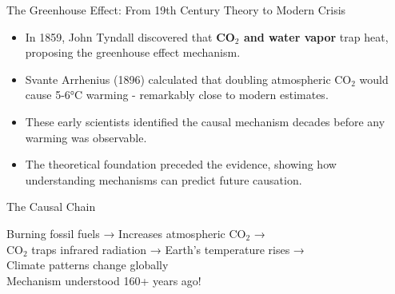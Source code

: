 \documentclass{beamer}
\begin{document}
	\begin{frame}{The Greenhouse Effect: From 19th Century Theory to Modern Crisis}
		\begin{itemize}
			\item In 1859, John Tyndall discovered that \textbf{CO$_2$ and water vapor} trap heat, proposing the greenhouse effect mechanism.
			\item Svante Arrhenius (1896) calculated that doubling atmospheric CO$_2$ would cause 5-6°C warming - remarkably close to modern estimates.
			\item These early scientists identified the causal mechanism decades before any warming was observable.
			\item The theoretical foundation preceded the evidence, showing how understanding mechanisms can predict future causation.
		\end{itemize}
		
		\begin{block}{The Causal Chain}
			\begin{center}
				Burning fossil fuels → Increases atmospheric CO$_2$ →\\
				CO$_2$ traps infrared radiation → Earth's temperature rises →\\
				Climate patterns change globally\\
				\vspace{0.2cm}
				Mechanism understood 160+ years ago!
			\end{center}
		\end{block}
	\end{frame}
	
\end{document}
